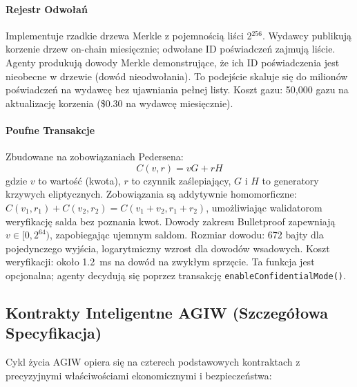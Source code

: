 \documentclass[11pt]{article}
\begin{document}
\paragraph{Rejestr Odwołań} Implementuje rzadkie drzewa Merkle z pojemnością liści 2$^{256}$. Wydawcy publikują korzenie drzew on-chain miesięcznie; odwołane ID poświadczeń zajmują liście. Agenty produkują dowody Merkle demonstrujące, że ich ID poświadczenia jest nieobecne w drzewie (dowód nieodwołania). To podejście skaluje się do milionów poświadczeń na wydawcę bez ujawniania pełnej listy. Koszt gazu: 50,000 gazu na aktualizację korzenia (\$0.30 na wydawcę miesięcznie).

\paragraph{Poufne Transakcje} Zbudowane na zobowiązaniach Pedersena:
\begin{equation}
C(v, r) = vG + rH
\end{equation}
gdzie $v$ to wartość (kwota), $r$ to czynnik zaślepiający, $G$ i $H$ to generatory krzywych eliptycznych. Zobowiązania są addytywnie homomorficzne: $C(v_1, r_1) + C(v_2, r_2) = C(v_1 + v_2, r_1 + r_2)$, umożliwiając walidatorom weryfikację salda bez poznania kwot. Dowody zakresu Bulletproof zapewniają $v \in [0, 2^{64})$, zapobiegając ujemnym saldom. Rozmiar dowodu: 672 bajty dla pojedynczego wyjścia, logarytmiczny wzrost dla dowodów wsadowych. Koszt weryfikacji: około 1.2~ms na dowód na zwykłym sprzęcie. Ta funkcja jest opcjonalna; agenty decydują się poprzez transakcję \texttt{enableConfidentialMode()}.

\subsection{Kontrakty Inteligentne AGIW (Szczegółowa Specyfikacja)}
\label{sec:agiw-contracts}
Cykl życia AGIW opiera się na czterech podstawowych kontraktach z precyzyjnymi właściwościami ekonomicznymi i bezpieczeństwa:
\end{document}
